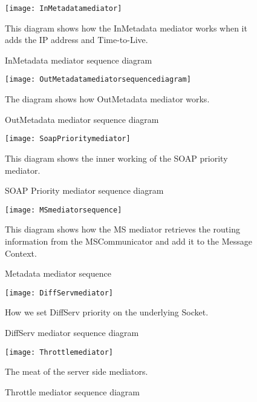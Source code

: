        \begin{figure}[H]
            \centering
            \texttt{[image: InMetadatamediator]}
            \caption{InMetadata mediator sequence diagram}
            This diagram shows how the InMetadata mediator works when it adds the IP address and Time-to-Live.
            \label{fig:InMetadatamediator}
        \end{figure}
        
        \begin{figure}[H]
            \centering
            \texttt{[image: OutMetadatamediatorsequencediagram]}
            \caption{OutMetadata mediator sequence diagram}
            The diagram shows how OutMetadata mediator works.
            \label{fig:OutMetadatamediatorsequencediagram}
        \end{figure}
        
        \begin{figure}[H] 
            \centering
            \texttt{[image: SoapPrioritymediator]}
            \caption{SOAP Priority mediator sequence diagram}
            This diagram shows the inner working of the SOAP priority mediator.
            \label{fig:SoapPrioritymediator}
        \end{figure}
    
        \begin{figure}[H] 
            \centering
            \texttt{[image: MSmediatorsequence]}
            \caption{Metadata mediator sequence}
            This diagram shows how the MS mediator retrieves the routing information from the MSCommunicator and add it to the Message Context.
            \label{fig:MSmediatorsequence}
        \end{figure}
        
        \begin{figure}[H]
            \centering
            \texttt{[image: DiffServmediator]}
            \caption{DiffServ mediator sequence diagram}
            How we set DiffServ priority on the underlying Socket.
            \label{fig:DiffServmediator}
        \end{figure}
        
        \begin{figure}[H] 
            \centering
            \texttt{[image: Throttlemediator]}
            \caption{Throttle mediator sequence diagram}
            The meat of the server side mediators.
            \label{fig:Throttlemediator}
        \end{figure}
        

